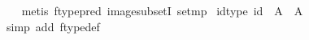 \begin{isabellebody}
%
\isadelimproof
\ \ %
\endisadelimproof
%
\isatagproof
{}\isamarkupfalse%
\ {}metis\ ftype{}pred\ image{}subsetI\ set{}mp{}%
\endisatagproof
{\isafoldproof}%
%
\isadelimproof
\isanewline
%
\endisadelimproof
\isanewline
{}\isamarkupfalse%
\ id{}type{}\ {}id\ {}\ A\ {}\ A{}\isanewline
%
\isadelimproof
\ \ %
\endisadelimproof
%
\isatagproof
{}\isamarkupfalse%
\ {}simp\ add{}\ ftype{}def{}%
\endisatagproof
{\isafoldproof}%
%
\isadelimproof
\isanewline
%
\endisadelimproof
%
\isadelimtheory
\isanewline
%
\endisadelimtheory
%
\isatagtheory
{}\isamarkupfalse%
%
\endisatagtheory
{\isafoldtheory}%
%
\isadelimtheory
\isanewline
%
\endisadelimtheory
\end{isabellebody}%
